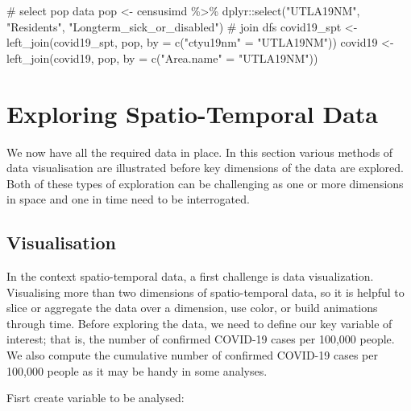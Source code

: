 \documentclass[
  letterpaper,
  DIV=11,
  numbers=noendperiod,
  oneside]{scrreprt}
\newenvironment{Shaded}{\begin{snugshade}}{\end{snugshade}}
\newcommand{\AttributeTok}[1]{\textcolor[rgb]{0.40,0.45,0.13}{#1}}
\newcommand{\CommentTok}[1]{\textcolor[rgb]{0.37,0.37,0.37}{#1}}
\newcommand{\FunctionTok}[1]{\textcolor[rgb]{0.28,0.35,0.67}{#1}}
\newcommand{\NormalTok}[1]{\textcolor[rgb]{0.00,0.23,0.31}{#1}}
\newcommand{\OtherTok}[1]{\textcolor[rgb]{0.00,0.23,0.31}{#1}}
\newcommand{\SpecialCharTok}[1]{\textcolor[rgb]{0.37,0.37,0.37}{#1}}
\newcommand{\StringTok}[1]{\textcolor[rgb]{0.13,0.47,0.30}{#1}}
\begin{document}
\begin{Shaded}
\begin{Highlighting}[]
\CommentTok{\# select pop data}
\NormalTok{pop }\OtherTok{\textless{}{-}}\NormalTok{ censusimd }\SpecialCharTok{\%\textgreater{}\%}\NormalTok{ dplyr}\SpecialCharTok{::}\FunctionTok{select}\NormalTok{(}\StringTok{"UTLA19NM"}\NormalTok{, }\StringTok{"Residents"}\NormalTok{, }\StringTok{"Longterm\_sick\_or\_disabled"}\NormalTok{)}
\CommentTok{\# join dfs}
\NormalTok{covid19\_spt }\OtherTok{\textless{}{-}} \FunctionTok{left\_join}\NormalTok{(covid19\_spt, pop,}
                         \AttributeTok{by =} \FunctionTok{c}\NormalTok{(}\StringTok{"ctyu19nm"} \OtherTok{=} \StringTok{"UTLA19NM"}\NormalTok{))}
\NormalTok{covid19 }\OtherTok{\textless{}{-}} \FunctionTok{left\_join}\NormalTok{(covid19, pop, }\AttributeTok{by =} \FunctionTok{c}\NormalTok{(}\StringTok{"Area.name"} \OtherTok{=} \StringTok{"UTLA19NM"}\NormalTok{))}
\end{Highlighting}
\end{Shaded}

\section{Exploring Spatio-Temporal
Data}\label{exploring-spatio-temporal-data}

We now have all the required data in place. In this section various
methods of data visualisation are illustrated before key dimensions of
the data are explored. Both of these types of exploration can be
challenging as one or more dimensions in space and one in time need to
be interrogated.

\subsection{Visualisation}\label{visualisation}

In the context spatio-temporal data, a first challenge is data
visualization. Visualising more than two dimensions of spatio-temporal
data, so it is helpful to slice or aggregate the data over a dimension,
use color, or build animations through time. Before exploring the data,
we need to define our key variable of interest; that is, the number of
confirmed COVID-19 cases per 100,000 people. We also compute the
cumulative number of confirmed COVID-19 cases per 100,000 people as it
may be handy in some analyses.

Fisrt create variable to be analysed:
\end{document}

